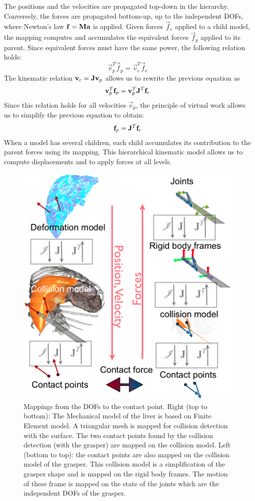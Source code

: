The positions and the velocities are propagated top-down in the hierarchy. 
Conversely, the forces are propagated bottom-up, up to the independent DOFs, where Newton's law $\mathbf{f }=\mathbf{{M}}\mathbf{a }$ is applied. 
Given forces $\vec f_c$ applied to a child model, the mapping computes and accumulates the equivalent forces $\vec f_p$ applied to its parent. 
Since equivalent forces must have the same power, the following relation holds:
$$
\vec v_{p}^T \vec f_p = \vec v_c^T \vec f_c
$$
The kinematic relation $\mathbf{v }_{c} = \mathbf{{J}} \mathbf{v }_{p}$ allows us to rewrite the previous equation as
$$
\mathbf{v }_{p}^T \mathbf{f }_{p} = \mathbf{v }_{p}^T \mathbf{{J}}^T \mathbf{f }_c
$$
Since this relation holds for all velocities $\vec v_p$, the principle of virtual work allows us to simplify the previous equation to obtain:
\begin{equation} \label{eq:mapF}
\mathbf{f }_{p} = \mathbf{{J}}^T \mathbf{f }_c
\end{equation}
When a model has several children, each child accumulates its contribution to the parent forces using its mapping. 
This hierarchical kinematic model allows us to compute displacements and to apply forces at all levels.
%
\begin{figure}
 \centering
 \includegraphics[width=0.9\linewidth]{MappingScheme.png}
 \caption{Mappings from the DOFs to the contact point. Right (top to bottom): The Mechanical model of the liver is based on Finite Element model. A triangular mesh is mapped for collision detection with the surface. The two contact points found by the collision detection (with the grasper) are mapped on the collision model. 
 Left (bottom to top): the contact points are also mapped on the collision model of the grasper. This collision model is a simplification of the grasper shape and is mapped on the rigid body frames. The motion of these frame is mapped on the state of the joints which are the independent DOFs of the grasper.
}
 \label{fig:hierarchy}
\end{figure}
